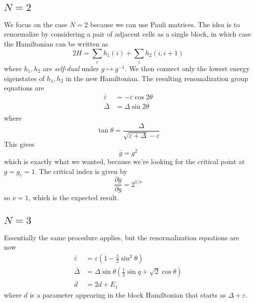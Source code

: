 \documentclass[11pt]{article}
\theoremstyle{definition}
\begin{document}
\subsection{$N=2$}
We focus on the case $N=2$ because we can use Pauli matrices.
The idea is to renormalize by considering a pair of adjacent cells as a single block, in which case the Hamiltonian can be written as
\[
2H = \sum_i h_1(i) + \sum_i h_2(i,i+1)
\]
where $h_1, h_2$ are \emph{self-dual} under $g \mapsto g^{-1}$.
We then connect only the lowest energy eigenstates of $h_1, h_2$ in the new Hamiltonian.
The resulting renomalization group equations are
\begin{align*}
\bar \varepsilon &= - \varepsilon \cos 2 \theta\\
\bar \Delta &= \Delta \sin 2 \theta\\
\end{align*}
where
\[
\tan \theta = \frac{\Delta}{\sqrt{\varepsilon + \Delta}-\varepsilon}
\]
This gives
\[
\bar g = g^2
\]
which is exactly what we wanted, because we're looking for the critical point at $g = g_c = 1$.
The critical index is given by
\[
\frac{\partial \bar g }{\partial g} = 2^{1/\nu}
\]
so $\nu = 1$, which is the expected result.
\subsection{$N=3$}
Essentially the same procedure applies, but the renormalization equations are now
\begin{align*}
\bar \varepsilon &= \varepsilon \left ( 1- \frac{3}{2} \sin^2 \theta \right)\\
\bar \Delta &= \Delta \sin \theta \left(\frac{1}{2} \sin q + \sqrt 2 \cos \theta \right)\\
\bar d &= 2d + E_1
\end{align*}
where $d$ is a parameter appearing in the block Hamiltonian that starts as $\Delta + \varepsilon$.
\end{document}
